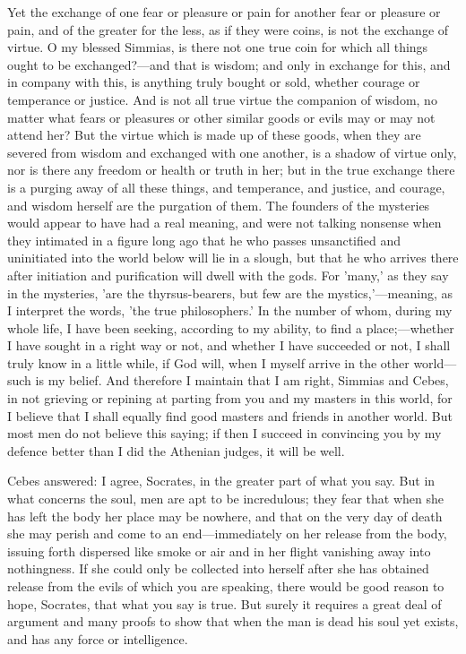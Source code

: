 Yet the exchange of one fear or pleasure or pain for another fear or
pleasure or pain, and of the greater for the less, as if they were coins,
is not the exchange of virtue. O my blessed Simmias, is there not one true
coin for which all things ought to be exchanged?—and that is wisdom;
and only in exchange for this, and in company with this, is anything truly
bought or sold, whether courage or temperance or justice. And is not all
true virtue the companion of wisdom, no matter what fears or pleasures or
other similar goods or evils may or may not attend her? But the virtue
which is made up of these goods, when they are severed from wisdom and
exchanged with one another, is a shadow of virtue only, nor is there any
freedom or health or truth in her; but in the true exchange there is a
purging away of all these things, and temperance, and justice, and
courage, and wisdom herself are the purgation of them. The founders of the
mysteries would appear to have had a real meaning, and were not talking
nonsense when they intimated in a figure long ago that he who passes
unsanctified and uninitiated into the world below will lie in a slough,
but that he who arrives there after initiation and purification will dwell
with the gods. For 'many,' as they say in the mysteries, 'are the
thyrsus-bearers, but few are the mystics,'—meaning, as I interpret
the words, 'the true philosophers.' In the number of whom, during my whole
life, I have been seeking, according to my ability, to find a place;—whether
I have sought in a right way or not, and whether I have succeeded or not,
I shall truly know in a little while, if God will, when I myself arrive in
the other world—such is my belief. And therefore I maintain that I
am right, Simmias and Cebes, in not grieving or repining at parting from
you and my masters in this world, for I believe that I shall equally find
good masters and friends in another world. But most men do not believe
this saying; if then I succeed in convincing you by my defence better than
I did the Athenian judges, it will be well.

Cebes answered: I agree, Socrates, in the greater part of what you say.
But in what concerns the soul, men are apt to be incredulous; they fear
that when she has left the body her place may be nowhere, and that on the
very day of death she may perish and come to an end—immediately on
her release from the body, issuing forth dispersed like smoke or air and
in her flight vanishing away into nothingness. If she could only be
collected into herself after she has obtained release from the evils of
which you are speaking, there would be good reason to hope, Socrates, that
what you say is true. But surely it requires a great deal of argument and
many proofs to show that when the man is dead his soul yet exists, and has
any force or intelligence.

